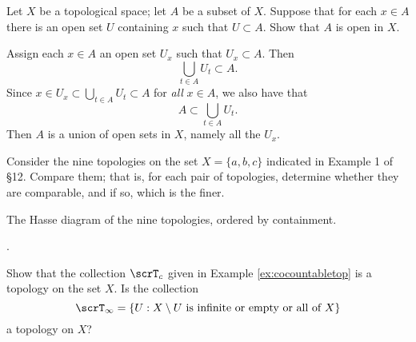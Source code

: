 \documentclass{article}
\begin{document}
\begin{exercise}
    Let $X$ be a topological space; let $A$ be a subset of $X$.
    Suppose that for each $x \in A$ there is an open set $U$ containing $x$ such that $U \subset A$.
    Show that $A$ is open in $X$.
\end{exercise}

Assign each $x \in A$ an open set $U_x$ such that $U_x \subset A$.
Then 
\[
    \bigcup_{t\in A} U_t \subset A.
\]
Since $x \in U_x \subset \bigcup_{t \in A} U_t \subset A$ for \textit{all} $x \in A$, we also have that
\[
    A \subset \bigcup_{t \in A} U_t.
\]
Then $A$ is a union of open sets in $X$, namely all the $U_x$.

\begin{exercise}
    Consider the nine topologies on the set $X = \{a,b,c\}$ indicated in Example 1 of §12.
    Compare them; that is, for each pair of topologies, determine whether they are comparable, and if so, which is the finer.
\end{exercise}

The Hasse diagram of the nine topologies, ordered by containment.

\begin{center}
    .
\end{center}

\begin{exercise}
    Show that the collection $\scrT_c$ given in Example \ref{ex:cocountabletop} is a topology on the set $X$.
    Is the collection
    \[
        \scrT_\infty = \{U : X \setminus U \text{ is infinite or empty or all of } X\}
    \]
    a topology on $X$?
\end{exercise}
\end{document}
